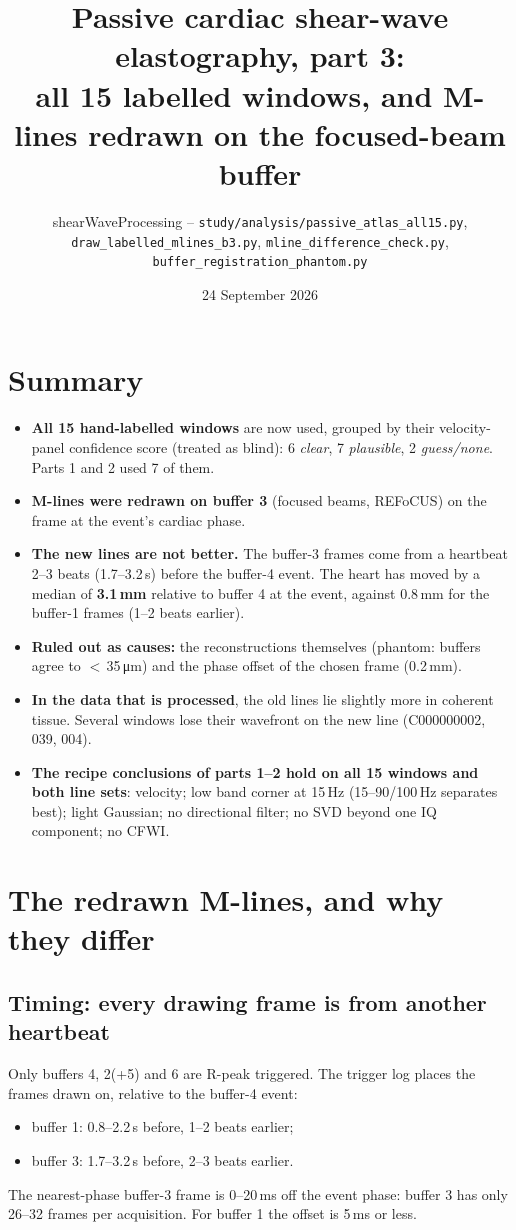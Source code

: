 \documentclass[10pt]{article}
\title{Passive cardiac shear-wave elastography, part 3:\\ all 15 labelled windows, and M-lines redrawn on the focused-beam buffer}
\author{shearWaveProcessing -- \texttt{study/analysis/passive\_atlas\_all15.py}, \texttt{draw\_labelled\_mlines\_b3.py}, \texttt{mline\_difference\_check.py}, \texttt{buffer\_registration\_phantom.py}}
\date{24 September 2026}
\begin{document}
\maketitle

\section*{Summary}
\begin{itemize}
  \item \textbf{All 15 hand-labelled windows} are now used, grouped by their velocity-panel
    confidence score (treated as blind): 6 \emph{clear}, 7 \emph{plausible}, 2
    \emph{guess/none}. Parts 1 and 2 used 7 of them.
  \item \textbf{M-lines were redrawn on buffer 3} (focused beams, REFoCUS) on the frame at the
    event's cardiac phase.
  \item \textbf{The new lines are not better.} The buffer-3 frames come from a heartbeat 2--3
    beats (1.7--3.2\,s) before the buffer-4 event. The heart has moved by a median of
    \textbf{3.1\,mm} relative to buffer 4 at the event, against 0.8\,mm for the buffer-1 frames
    (1--2 beats earlier).
  \item \textbf{Ruled out as causes:} the reconstructions themselves (phantom: buffers agree to
    $<$\,35\,\si{\micro\metre}) and the phase offset of the chosen frame (0.2\,mm).
  \item \textbf{In the data that is processed}, the old lines lie slightly more in coherent tissue.
    Several windows lose their wavefront on the new line (C000000002, 039, 004).
  \item \textbf{The recipe conclusions of parts 1--2 hold on all 15 windows and both line sets}:
    velocity; low band corner at 15\,Hz (15--90/100\,Hz separates best); light Gaussian; no
    directional filter; no SVD beyond one IQ component; no CFWI.
\end{itemize}

\section{The redrawn M-lines, and why they differ}

\subsection*{Timing: every drawing frame is from another heartbeat}
Only buffers 4, 2(+5) and 6 are R-peak triggered. The trigger log places the frames drawn on,
relative to the buffer-4 event:
\begin{itemize}
  \item buffer 1: 0.8--2.2\,s before, 1--2 beats earlier;
  \item buffer 3: 1.7--3.2\,s before, 2--3 beats earlier.
\end{itemize}
The nearest-phase buffer-3 frame is 0--20\,ms off the event phase: buffer 3 has only 26--32
frames per acquisition. For buffer 1 the offset is 5\,ms or less.
\end{document}
